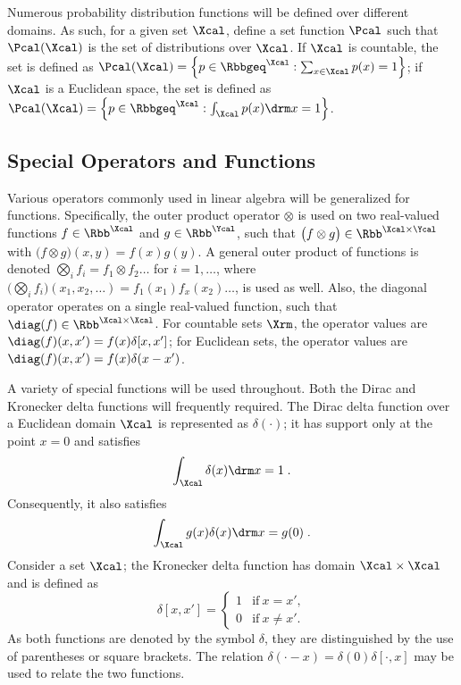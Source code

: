 \documentclass[12pt]{report}
\newcommand{\todolow}[1]{\todo[inline,color=blue!50,linecolor=red]{#1}}
\newcommand{\todolo}[1]{\todo[inline,color=green!50,linecolor=red]{#1}}
\begin{document}
Numerous probability distribution functions will be defined over different domains. As such, for a given set $\Xcal$, define a set function $\Pcal$ such that $\Pcal(\Xcal)$ is the set of distributions over $\Xcal$. If $\Xcal$ is countable, the set is defined as $\Pcal(\Xcal) = \left\{ p \in {\Rbbgeq}^{\Xcal}: \sum_{x \in \Xcal} p(x) = 1 \right\}$; if $\Xcal$ is a Euclidean space, the set is defined as $\Pcal(\Xcal) = \left\{ p \in {\Rbbgeq}^{\Xcal}: \int_{\Xcal} p(x) {\drm}x = 1 \right\}$.

\todolo{aleph reference?}



\subsection*{Special Operators and Functions}

Various operators commonly used in linear algebra will be generalized for functions. Specifically, the outer product operator $\otimes$ is used on two real-valued functions $f \in \Rbb^{\Xcal}$ and $g \in \Rbb^{\Ycal}$, such that $\big(f \otimes g\big) \in \Rbb^{\Xcal \times \Ycal}$ with $\big(f \otimes g\big) (x,y) = f(x) g(y)$. A general outer product of functions is denoted $\bigotimes_i f_i = f_1 \otimes f_2 \ldots$ for $i = 1,\ldots$, where $\Big(\bigotimes_i f_i\Big)(x_1,x_2,\ldots) = f_1(x_1)f_x(x_2)\ldots$, is used as well. Also, the diagonal operator operates on a single real-valued function, such that $\diag(f) \in \Rbb^{\Xcal \times \Xcal}$. For countable sets $\Xrm$, the operator values are $\diag(f)(x,x') = f(x) \delta[x,x']$; for Euclidean sets, the operator values are $\diag(f)(x,x') = f(x) \delta(x-x')$.

\todolow{tensor product?}


A variety of special functions will be used throughout. Both the Dirac and Kronecker delta functions will frequently required. The Dirac delta function over a Euclidean domain $\Xcal$ is represented as $\delta(\cdot)$; it has support only at the point $x=0$ and satisfies
\begin{equation}
	\int_{\Xcal} \delta(x) {\drm}x = 1 \;.
\end{equation}
Consequently, it also satisfies
\begin{equation}
	\int_{\Xcal} g(x) \delta(x) {\drm}x = g(0) \;.
\end{equation}
Consider a set $\Xcal$; the Kronecker delta function has domain $\Xcal \times \Xcal$ and is defined as
\begin{equation}
	\delta[x,x'] = \begin{cases} 1 & \mathrm{if} \ x = x', \\ 0 & \mathrm{if} \ x \neq x'.  \end{cases}
\end{equation}
As both functions are denoted by the symbol $\delta$, they are distinguished by the use of parentheses or square brackets. The relation $\delta(\cdot - x) = \delta(0) \delta[\cdot, x]$ may be used to relate the two functions.
\end{document}
